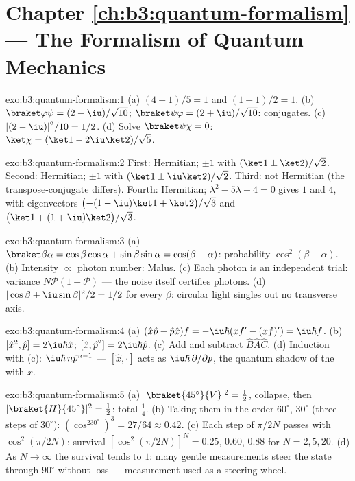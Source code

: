 \section*{Chapter \ref{ch:b3:quantum-formalism} --- The Formalism of Quantum Mechanics}

\begin{solution}{exo:b3:quantum-formalism:1}
(a) $(4 + 1)/5 = 1$ and $(1 + 1)/2 = 1$. (b) $\braket\varphi\psi =
(2 - \iu)/\sqrt{10}$; $\braket\psi\varphi = (2 + \iu)/\sqrt{10}$:
conjugates. (c) $|(2 - \iu)|^2/10 = 1/2$. (d) Solve
$\braket\psi\chi = 0$: $\ket\chi = (\ket1 - 2\iu\ket2)/\sqrt5$.
\end{solution}

\begin{solution}{exo:b3:quantum-formalism:2}
First: Hermitian; $\pm1$ with $(\ket1 \pm \ket2)/\sqrt2$. Second:
Hermitian; $\pm1$ with $(\ket1 \pm \iu\ket2)/\sqrt2$. Third: not
Hermitian (the transpose-conjugate differs). Fourth: Hermitian;
$\lambda^2 - 5\lambda + 4 = 0$ gives $1$ and $4$, with eigenvectors
$\big({-(1 - \iu)}\ket1 + \ket2\big)/\sqrt3$ and $\big(\ket1 +
(1 + \iu)\ket2\big)/\sqrt3$.
\end{solution}

\begin{solution}{exo:b3:quantum-formalism:3}
(a) $\braket\beta\alpha = \cos\beta\cos\alpha + \sin\beta\sin\alpha
= \cos(\beta - \alpha)$: probability $\cos^2(\beta - \alpha)$. (b)
Intensity $\propto$ photon number: Malus. (c) Each photon is an
independent trial: variance $N\mathcal P(1 - \mathcal P)$ --- the
noise itself certifies photons. (d) $|\cos\beta + \iu\sin\beta|^2/2
= 1/2$ for every $\beta$: circular light singles out no transverse
axis.
\end{solution}

\begin{solution}{exo:b3:quantum-formalism:4}
(a) $(\hat x\hat p - \hat p\hat x)f = -\iu\hbar(xf' - (xf)') =
\iu\hbar f$. (b) $[\hat x^2, \hat p] = 2\iu\hbar\hat x$; $[\hat x,
\hat p^2] = 2\iu\hbar\hat p$. (c) Add and subtract $\hat B\hat A
\hat C$. (d) Induction with (c): $\iu\hbar\,n\hat p^{n-1}$ ---
$[\hat x, \cdot]$ acts as $\iu\hbar\,\partial/\partial p$, the
quantum shadow of the  with $x$.
\end{solution}

\begin{solution}{exo:b3:quantum-formalism:5}
(a) $|\braket{45^\circ}{V}|^2 = \tfrac12$, collapse, then
$|\braket{H}{45^\circ}|^2 = \tfrac12$: total $\tfrac14$. (b) Taking
them in the order $60^\circ$, $30^\circ$ (three steps of $30^\circ$):
$(\cos^230^\circ)^3 = 27/64 \approx 0.42$. (c) Each step of
$\pi/2N$ passes with $\cos^2(\pi/2N)$: survival $[\cos^2(\pi/2N)]^N
= 0.25$, $0.60$, $0.88$ for $N = 2, 5, 20$. (d) As $N \to \infty$
the survival tends to $1$: many gentle measurements steer the state
through $90^\circ$ without loss --- measurement used as a steering
wheel.
\end{solution}

